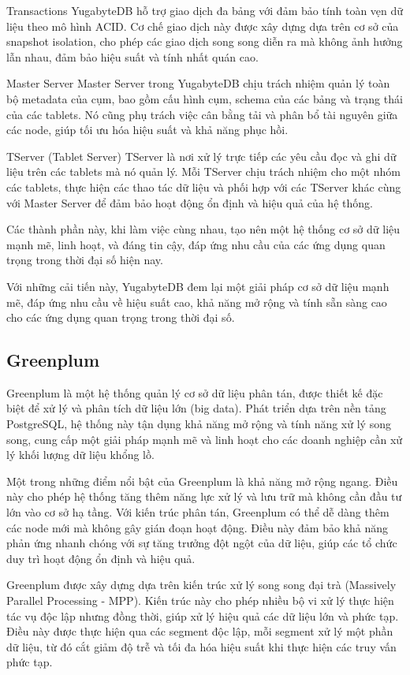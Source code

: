 \documentclass{article}[14pt]
\begin{document}
Transactions
YugabyteDB hỗ trợ giao dịch đa bảng với đảm bảo tính toàn vẹn dữ liệu theo mô hình ACID. Cơ chế giao dịch này được xây dựng dựa trên cơ sở của snapshot isolation, cho phép các giao dịch song song diễn ra mà không ảnh hưởng lẫn nhau, đảm bảo hiệu suất và tính nhất quán cao.

Master Server
Master Server trong YugabyteDB chịu trách nhiệm quản lý toàn bộ metadata của cụm, bao gồm cấu hình cụm, schema của các bảng và trạng thái của các tablets. Nó cũng phụ trách việc cân bằng tải và phân bổ tài nguyên giữa các node, giúp tối ưu hóa hiệu suất và khả năng phục hồi.

TServer (Tablet Server)
TServer là nơi xử lý trực tiếp các yêu cầu đọc và ghi dữ liệu trên các tablets mà nó quản lý. Mỗi TServer chịu trách nhiệm cho một nhóm các tablets, thực hiện các thao tác dữ liệu và phối hợp với các TServer khác cùng với Master Server để đảm bảo hoạt động ổn định và hiệu quả của hệ thống.

Các thành phần này, khi làm việc cùng nhau, tạo nên một hệ thống cơ sở dữ liệu mạnh mẽ, linh hoạt, và đáng tin cậy, đáp ứng nhu cầu của các ứng dụng quan trọng trong thời đại số hiện nay.

Với những cải tiến này, YugabyteDB đem lại một giải pháp cơ sở dữ liệu mạnh mẽ, đáp ứng nhu cầu về hiệu suất cao, khả năng mở rộng và tính sẵn sàng cao cho các ứng dụng quan trọng trong thời đại số.

\subsection{Greenplum}


Greenplum \cite{lyu2021greenplum} là một hệ thống quản lý cơ sở dữ liệu phân tán, được thiết kế đặc biệt để xử lý và phân tích dữ liệu lớn (big data). Phát triển dựa trên nền tảng PostgreSQL, hệ thống này tận dụng khả năng mở rộng và tính năng xử lý song song, cung cấp một giải pháp mạnh mẽ và linh hoạt cho các doanh nghiệp cần xử lý khối lượng dữ liệu khổng lồ.

Một trong những điểm nổi bật của Greenplum là khả năng mở rộng ngang. Điều này cho phép hệ thống tăng thêm năng lực xử lý và lưu trữ mà không cần đầu tư lớn vào cơ sở hạ tầng. Với kiến trúc phân tán, Greenplum có thể dễ dàng thêm các node mới mà không gây gián đoạn hoạt động. Điều này đảm bảo khả năng phản ứng nhanh chóng với sự tăng trưởng đột ngột của dữ liệu, giúp các tổ chức duy trì hoạt động ổn định và hiệu quả.

Greenplum được xây dựng dựa trên kiến trúc xử lý song song đại trà (Massively Parallel Processing - MPP). Kiến trúc này cho phép nhiều bộ vi xử lý thực hiện tác vụ độc lập nhưng đồng thời, giúp xử lý hiệu quả các dữ liệu lớn và phức tạp. Điều này được thực hiện qua các segment độc lập, mỗi segment xử lý một phần dữ liệu, từ đó cắt giảm độ trễ và tối đa hóa hiệu suất khi thực hiện các truy vấn phức tạp.
\end{document}
